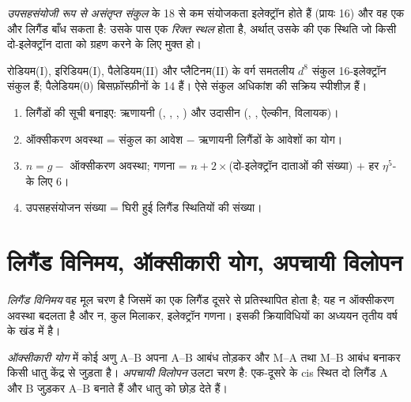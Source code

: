 \begin{definition}[असंतृप्त संकुल]\label{def:b2:catalytic-cycles:unsaturated}
\emph{उपसहसंयोजी रूप से असंतृप्त संकुल}
के 18 से कम संयोजकता इलेक्ट्रॉन होते हैं (प्रायः 16) और वह एक और लिगैंड बाँध सकता है: उसके पास
एक \emph{रिक्त स्थल} होता है, अर्थात् उसके  की एक स्थिति जो
किसी दो-इलेक्ट्रॉन दाता को ग्रहण करने के लिए मुक्त हो।
\end{definition}

रोडियम(I), इरिडियम(I), पैलेडियम(II) और
प्लैटिनम(II) के वर्ग समतलीय $d^8$ संकुल 16-इलेक्ट्रॉन संकुल हैं; पैलेडियम(0) बिसफ़ॉस्फ़ीनों  के 14 हैं।
ऐसे संकुल अधिकांश  की सक्रिय स्पीशीज़ हैं।

\begin{method}[कार्बधात्विक संकुल की गणना]\label{met:b2:catalytic-cycles:count-organometallic}
\begin{enumerate}
  \item लिगैंडों की सूची बनाइए: ऋणायनी (, , , ) और उदासीन
        (, , ऐल्कीन, विलायक)।
  \item ऑक्सीकरण अवस्था = संकुल का आवेश $-$ ऋणायनी लिगैंडों के आवेशों का योग।
  \item $n = g -$ ऑक्सीकरण अवस्था; गणना = $n + 2 \times$(दो-इलेक्ट्रॉन दाताओं की संख्या)
        $+$ हर $\eta^5$- के लिए 6।
  \item उपसहसंयोजन संख्या = घिरी हुई लिगैंड स्थितियों की संख्या।
\end{enumerate}
\end{method}

\section{लिगैंड विनिमय, ऑक्सीकारी योग, अपचायी विलोपन}

\begin{definition}[लिगैंड विनिमय]\label{def:b2:catalytic-cycles:ligand-exchange}
\emph{लिगैंड विनिमय} वह मूल चरण है जिसमें  का
एक लिगैंड दूसरे से प्रतिस्थापित होता है; यह न ऑक्सीकरण अवस्था बदलता है
और न, कुल मिलाकर, इलेक्ट्रॉन गणना। इसकी क्रियाविधियों का अध्ययन तृतीय वर्ष के खंड में है।
\end{definition}

\begin{definition}[ऑक्सीकारी योग और अपचायी विलोपन]\label{def:b2:catalytic-cycles:oxidative-addition}
\emph{ऑक्सीकारी योग} में कोई अणु A--B अपना A--B आबंध तोड़कर और
M--A तथा M--B आबंध बनाकर किसी धातु केंद्र से जुड़ता है।
\emph{अपचायी विलोपन} उलटा चरण है: एक-दूसरे के cis स्थित दो
लिगैंड A और B जुड़कर A--B बनाते हैं और धातु को छोड़ देते हैं।
\end{definition}

